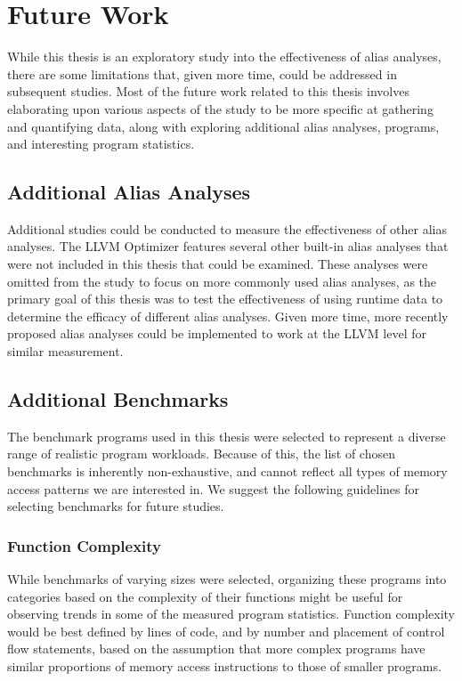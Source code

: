 \chapter{Future Work}

While this thesis is an exploratory study into the effectiveness of alias analyses, there are some limitations that, given more time, could be addressed in subsequent studies. Most of the future work related to this thesis involves elaborating upon various aspects of the study to be more specific at gathering and quantifying data, along with exploring additional alias analyses, programs, and interesting program statistics.

\section{Additional Alias Analyses}
Additional studies could be conducted to measure the effectiveness of other alias analyses. The LLVM Optimizer features several other built-in alias analyses that were not included in this thesis that could be examined. These analyses were omitted from the study to focus on more commonly used alias analyses, as the primary goal of this thesis was to test the effectiveness of using runtime data to determine the efficacy of different alias analyses. Given more time, more recently proposed alias analyses could be implemented to work at the LLVM level for similar measurement.

\section{Additional Benchmarks}
The benchmark programs used in this thesis were selected to represent a diverse range of realistic program workloads. Because of this, the list of chosen benchmarks is inherently non-exhaustive, and cannot reflect all types of memory access patterns we are interested in. We suggest the following guidelines for selecting benchmarks for future studies.

\subsection{Function Complexity}
While benchmarks of varying sizes were selected, organizing these programs into categories based on the complexity of their functions might be useful for observing trends in some of the measured program statistics. Function complexity would be best defined by lines of code, and by number and placement of control flow statements, based on the assumption that more complex programs have similar proportions of memory access instructions to those of smaller programs.


